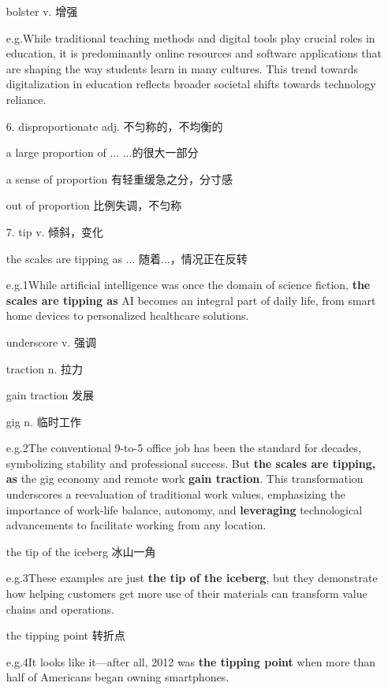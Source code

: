 \begin{itemize}
    bolster v. 增强
    
    e.g.\qquad While traditional teaching methods and digital 
    tools play crucial roles in education, it is 
    predominantly online resources and software 
    applications that are shaping the way students 
    learn in many cultures. This trend towards 
    digitalization in education reflects broader societal 
    shifts towards technology reliance.
    \item [6.]disproportionate adj. 不匀称的，不均衡的
    
    a large proportion of ... ...的很大一部分

    a sense of proportion 有轻重缓急之分，分寸感

    out of proportion 比例失调，不匀称
    \item [7.]tip v. 倾斜，变化
    
    the scales are tipping as ... 随着...，情况正在反转

    e.g.1\qquad While artificial intelligence was once the domain 
    of science fiction, \textbf{the scales are tipping as }
    AI becomes an integral part of daily life, from 
    smart home devices to personalized healthcare solutions.

    underscore v. 强调
    
    traction n. 拉力

    gain traction 发展

    gig n. 临时工作

    e.g.2\qquad The conventional 9-to-5 office job has been the 
    standard for decades, symbolizing stability and 
    professional success. But \textbf{the scales are tipping, as }
    the gig economy and remote work \textbf{gain traction}. 
    This transformation underscores a reevaluation 
    of traditional work values, emphasizing 
    the importance of work-life balance, autonomy, 
    and \textbf{leveraging }technological advancements 
    to facilitate working from any location.

    the tip of the iceberg 冰山一角

    e.g.3\qquad These examples are just \textbf{the tip of the iceberg}, 
    but they demonstrate how helping 
    customers get more use of their materials can 
    transform value chains and operations.

    the tipping point 转折点

    e.g.4\qquad It looks like it---after all, 
    2012 was \textbf{the tipping point }when more than half 
    of Americans began owning smartphones.


\end{itemize}
